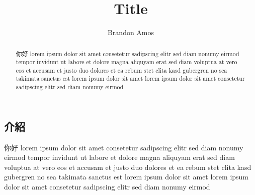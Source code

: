 \documentclass{article} %
\title{Title}
\author{Brandon Amos}
\begin{document}
\begin{CJK*}{UTF8}{bkai}   %

\maketitle

\begin{abstract}
你好
lorem ipsum dolor sit amet consetetur sadipscing elitr sed diam nonumy
eirmod tempor invidunt ut labore et dolore magna aliquyam erat sed diam
voluptua at vero eos et accusam et justo duo dolores et ea rebum stet clita
kasd gubergren no sea takimata sanctus est lorem ipsum dolor sit amet lorem
ipsum dolor sit amet consetetur sadipscing elitr sed diam nonumy eirmod
\end{abstract}

\section{介紹}
你好
lorem ipsum dolor sit amet consetetur sadipscing elitr sed diam nonumy
eirmod tempor invidunt ut labore et dolore magna aliquyam erat sed diam
voluptua at vero eos et accusam et justo duo dolores
et ea rebum stet clita\cite{article}
kasd gubergren no sea takimata sanctus est lorem ipsum dolor sit amet lorem
ipsum dolor sit amet consetetur sadipscing elitr sed diam nonumy eirmod



\end{CJK*}  %
\end{document}
